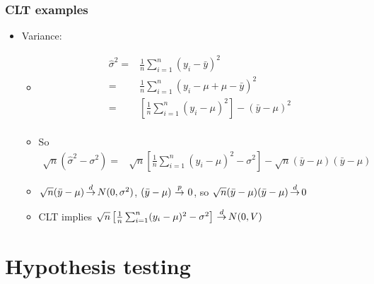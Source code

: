 \begin{frame}[allowframebreaks]
  \frametitle{CLT examples}
  \begin{itemize}
  \item Variance: 
    \begin{itemize}
    \item 
      \begin{align*}
        \hat{\sigma}^2 = & \frac{1}{n} \sum_{i=1}^n (y_i - \bar{y})^2 \\
        = & \frac{1}{n} \sum_{i=1}^n (y_i - \mu + \mu - \bar{y})^2 \\
        = & \left[\frac{1}{n} \sum_{i=1}^n (y_i - \mu)^2\right] -
        (\bar{y} - \mu)^2 \\
      \end{align*}
    \item So
      \begin{align*}
        \sqrt{n}( \hat{\sigma}^2  - \sigma^2) = & \sqrt{n}
        \left[\frac{1}{n} \sum_{i=1}^n (y_i - \mu)^2 - \sigma^2 \right]
        - \sqrt{n}(\bar{y} - \mu) (\bar{y} - \mu) 
      \end{align*}
    \item $\sqrt{n}(\bar{y} - \mu) \indist N(0,\sigma^2)$, $(\bar{y} -
      \mu)  \inprob 0$, so $\sqrt{n}(\bar{y} - \mu) (\bar{y} - \mu)
      \indist 0$
    \item CLT implies $\sqrt{n}
      \left[\frac{1}{n} \sum_{i=1}^n (y_i - \mu)^2 - \sigma^2
      \right] \indist N(0,V)$       
    \end{itemize}
  \end{itemize}
\end{frame}

\section{Hypothesis testing}

